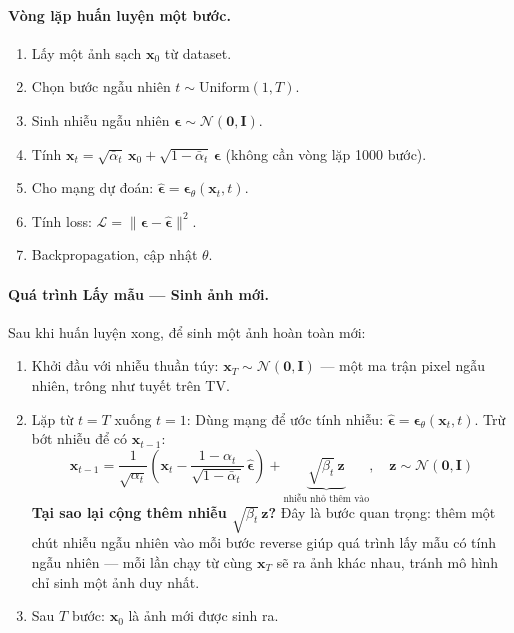 \paragraph{Vòng lặp huấn luyện một bước.}

\begin{enumerate}
    \item Lấy một ảnh sạch $\mathbf{x}_0$ từ dataset.
    \item Chọn bước ngẫu nhiên $t \sim \text{Uniform}(1, T)$.
    \item Sinh nhiễu ngẫu nhiên $\boldsymbol{\epsilon} \sim \mathcal{N}(\mathbf{0}, \mathbf{I})$.
    \item Tính $\mathbf{x}_t = \sqrt{\bar{\alpha}_t}\,\mathbf{x}_0 + \sqrt{1-\bar{\alpha}_t}\,\boldsymbol{\epsilon}$ \hfill (không cần vòng lặp 1000 bước).
    \item Cho mạng dự đoán: $\hat{\boldsymbol{\epsilon}} = \boldsymbol{\epsilon}_\theta(\mathbf{x}_t, t)$.
    \item Tính loss: $\mathcal{L} = \|\boldsymbol{\epsilon} - \hat{\boldsymbol{\epsilon}}\|^2$.
    \item Backpropagation, cập nhật $\theta$.
\end{enumerate}


\paragraph{Quá trình Lấy mẫu --- Sinh ảnh mới.}

Sau khi huấn luyện xong, để sinh một ảnh hoàn toàn mới:

\begin{enumerate}
    \item Khởi đầu với nhiễu thuần túy: $\mathbf{x}_T \sim \mathcal{N}(\mathbf{0}, \mathbf{I})$ --- một ma trận pixel ngẫu nhiên, trông như tuyết trên TV.
    \item Lặp từ $t = T$ xuống $t = 1$: Dùng mạng để ước tính nhiễu: $\hat{\boldsymbol{\epsilon}} = \boldsymbol{\epsilon}_\theta(\mathbf{x}_t, t)$. Trừ bớt nhiễu để có $\mathbf{x}_{t-1}$:
    \[
        \mathbf{x}_{t-1} = \frac{1}{\sqrt{\alpha_t}}\!\left(\mathbf{x}_t - \frac{1-\alpha_t}{\sqrt{1-\bar{\alpha}_t}}\,\hat{\boldsymbol{\epsilon}}\right) + \underbrace{\sqrt{\beta_t}\,\mathbf{z}}_{\text{nhiễu nhỏ thêm vào}}, \quad \mathbf{z} \sim \mathcal{N}(\mathbf{0},\mathbf{I})
    \]
    \textbf{Tại sao lại cộng thêm nhiễu $\sqrt{\beta_t}\,\mathbf{z}$?} Đây là bước quan trọng: thêm một chút nhiễu ngẫu nhiên vào mỗi bước reverse giúp quá trình lấy mẫu có tính ngẫu nhiên --- mỗi lần chạy từ cùng $\mathbf{x}_T$ sẽ ra ảnh khác nhau, tránh mô hình chỉ sinh một ảnh duy nhất.
    \item Sau $T$ bước: $\mathbf{x}_0$ là ảnh mới được sinh ra.
\end{enumerate}


